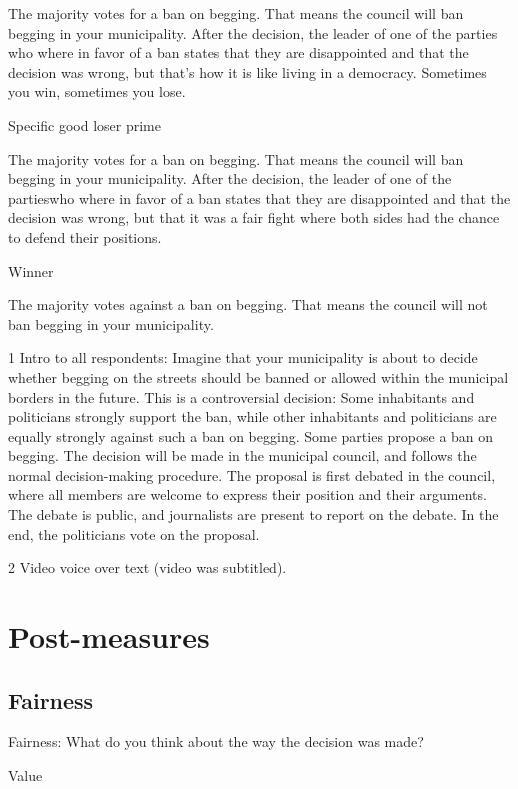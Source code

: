 \documentclass[
]{book}
\begin{document}
The majority votes for a ban on begging. That means the council will ban
begging in your municipality. After the decision, the leader of one of
the parties who where in favor of a ban states that they are
disappointed and that the decision was wrong, but that's how it is like
living in a democracy. Sometimes you win, sometimes you lose.

Specific good loser prime

The majority votes for a ban on begging. That means the council will ban
begging in your municipality. After the decision, the leader of one of
the partieswho where in favor of a ban states that they are disappointed
and that the decision was wrong, but that it was a fair fight where both
sides had the chance to defend their positions.

Winner

The majority votes against a ban on begging. That means the council will
not ban begging in your municipality.

1 Intro to all respondents: Imagine that your municipality is about to
decide whether begging on the streets should be banned or allowed within
the municipal borders in the future. This is a controversial decision:
Some inhabitants and politicians strongly support the ban, while other
inhabitants and politicians are equally strongly against such a ban on
begging. Some parties propose a ban on begging. The decision will be
made in the municipal council, and follows the normal decision-making
procedure. The proposal is first debated in the council, where all
members are welcome to express their position and their arguments. The
debate is public, and journalists are present to report on the debate.
In the end, the politicians vote on the proposal.

2 Video voice over text (video was subtitled).

\hypertarget{post-measures}{%
\section{Post-measures}\label{post-measures}}

\hypertarget{fairness-2}{%
\subsection{Fairness}\label{fairness-2}}

Fairness: What do you think about the way the decision was made?

Value
\end{document}

